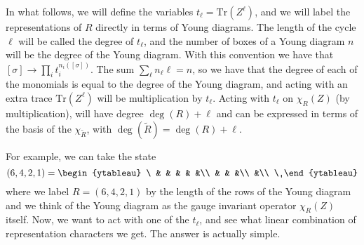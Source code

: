 \documentclass[12pt,nofootinbib, longbibliography]{revtex4-1}
\def\Tr{\textrm{Tr}}
\begin{document}
In what follows, we will define the variables $t_\ell= \Tr(Z^\ell)$, and we will label the representations of $R$ directly in terms of Young diagrams. The length of the cycle $\ell$ will be called the degree of $t_\ell$, and the number of boxes of a Young diagram $n$ will be the degree of the Young diagram. 
With this convention we have that $ [\sigma]\to \prod_i t_i^{n_i([\sigma])}$.
 The sum $\sum_\ell n_\ell \ell = n$, so we have that the degree of each of the monomials is equal to the degree of the Young diagram, and acting with an extra trace $\Tr(Z^\ell)$ will be multiplication by 
 $t_\ell$. Acting with $t_\ell $ on $\chi_R(Z)$ (by multiplication), will have degree $\deg(R)+\ell$ and can be expressed in terms of the basis of the $\chi_{\tilde R}$, with $\deg(\tilde R) = \deg(R)+\ell$.


 For example, we can take the state
\begin{equation}
(6,4,2,1) = \begin{ytableau}
\ & & & & &\\
& & &\\
&\\
\
\end{ytableau}
\end{equation}
where we label $R= (6,4,2,1) $ by the length of the rows of the Young diagram and we think of the Young diagram as the gauge invariant operator $\chi_{R}(Z)$ itself. Now, we want to act with one of the $t_\ell$, and see what linear combination of representation characters we get. The answer is actually simple.
\end{document}
